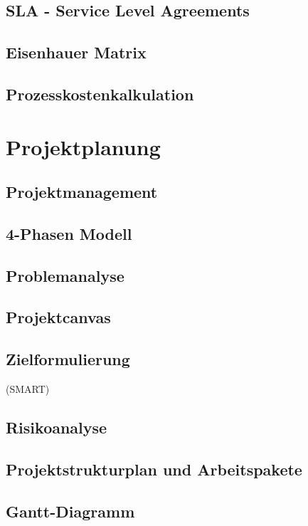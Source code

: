 \subsection{SLA - Service Level Agreements}

\subsection{Eisenhauer Matrix}

\subsection{Prozesskostenkalkulation}

\section{Projektplanung}

\subsection{Projektmanagement}

\subsection{4-Phasen Modell}

\subsection{Problemanalyse}

\subsection{Projektcanvas}

\subsection{Zielformulierung} (SMART)

\subsection{Risikoanalyse}

\subsection{Projektstrukturplan und Arbeitspakete}

\subsection{Gantt-Diagramm}

